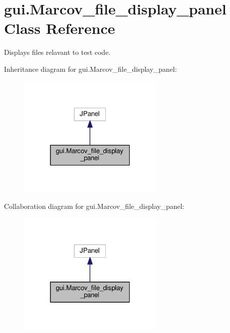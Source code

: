 \hypertarget{classgui_1_1_marcov__file__display__panel}{}\section{gui.\+Marcov\+\_\+file\+\_\+display\+\_\+panel Class Reference}
\label{classgui_1_1_marcov__file__display__panel}


Displays files relavant to test code.  




Inheritance diagram for gui.\+Marcov\+\_\+file\+\_\+display\+\_\+panel\+:\nopagebreak
\begin{figure}[H]
\begin{center}
\leavevmode
\includegraphics[width=199pt]{classgui_1_1_marcov__file__display__panel__inherit__graph}
\end{center}
\end{figure}


Collaboration diagram for gui.\+Marcov\+\_\+file\+\_\+display\+\_\+panel\+:\nopagebreak
\begin{figure}[H]
\begin{center}
\leavevmode
\includegraphics[width=199pt]{classgui_1_1_marcov__file__display__panel__coll__graph}
\end{center}
\end{figure}
